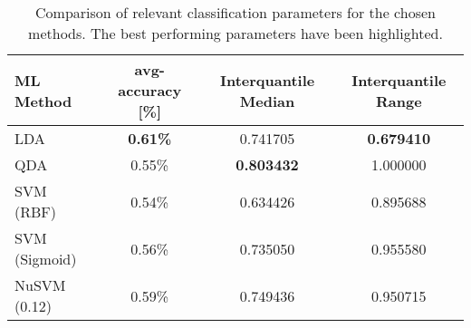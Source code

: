 \documentclass[../main.tex]{subfiles}
\begin{document}
\begin{table}[H]
\begin{center}
\begin{tabular}{ |l|c|c|c| } 
 \hline
 ML Method & avg-accuracy [\%] & Interquantile Median & Interquantile Range \\ 
 \hline
 LDA & \textbf{0.61\%}           & 0.741705 & \textbf{0.679410} \\ 
 QDA & 0.55\%           & \textbf{0.803432} & 1.000000 \\ 
 SVM (RBF) & 0.54\%     & 0.634426 & 0.895688 \\ 
 SVM (Sigmoid) & 0.56\% & 0.735050 & 0.955580 \\ 
 NuSVM (0.12) & 0.59\%  & 0.749436 & 0.950715 \\ 
 \hline
\end{tabular}
\caption{Comparison of relevant classification parameters for the chosen methods. The best performing parameters have been highlighted.}
\label{tab:classification_comparison}
\end{center}
\end{table}

\end{document}
